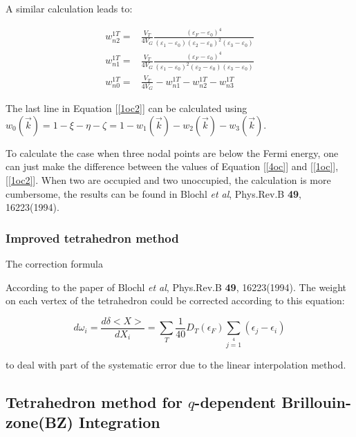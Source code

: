 \documentclass[10pt]{article}
\begin{document}
A similar calculation leads to:

\begin{equation}\label{1oc2}
\begin{align}
w_{n2}^{1T}=&\frac{V_T}{4V_G}\frac{(\varepsilon_F-\varepsilon_0)^4}
{(\varepsilon_1-\varepsilon_0)(\varepsilon_2-\varepsilon_0)^2(\varepsilon_3-\varepsilon_0)}\\
w_{n1}^{1T}=&\frac{V_T}{4V_G}\frac{(\varepsilon_F-\varepsilon_0)^4}
{(\varepsilon_1-\varepsilon_0)^2(\varepsilon_2-\varepsilon_0)(\varepsilon_3-\varepsilon_0)}\\
w_{n0}^{1T}=&\frac{V_T}{4V_G}-w_{n1}^{1T}-w_{n2}^{1T}-w_{n3}^{1T}
\end{align}
\end{equation}

The last line in Equation [\ref{1oc2}] can be calculated using
$w_0(\vec{k})=1-\xi-\eta-\zeta=1-w_1(\vec{k})-w_2(\vec{k})-w_3(\vec{k})$.

To calculate the case when three nodal points are below the Fermi energy, one can just make the
difference between the values of Equation [\ref{4oc}] and [\ref{1oc}],[\ref{1oc2}]. When two are occupied and
two unoccupied, the calculation is more cumbersome, the results can be found in Blochl \textit{et al}, Phys.Rev.B \textbf{49}, 16223(1994).

\subsubsection{Improved tetrahedron method}

{\sf The correction formula}

According to the paper of Blochl \textit{et al}, Phys.Rev.B \textbf{49}, 16223(1994). The weight on each vertex of the tetrahedron could be corrected according to this equation:

\begin{equation}\label{weightcorrect}
d\omega_i=\frac{d\delta<X>}{dX_i}=\sum\limits_{T}\frac{1}{40}D_T(\epsilon_F)\sum\limits_{j=1}\limits^{4}(\epsilon_{j}-\epsilon_{i})
\end{equation}

to deal with part of the systematic error due to the linear interpolation method.

\subsection{Tetrahedron method for $q$-dependent Brillouin-zone(BZ) Integration}
\end{document}
